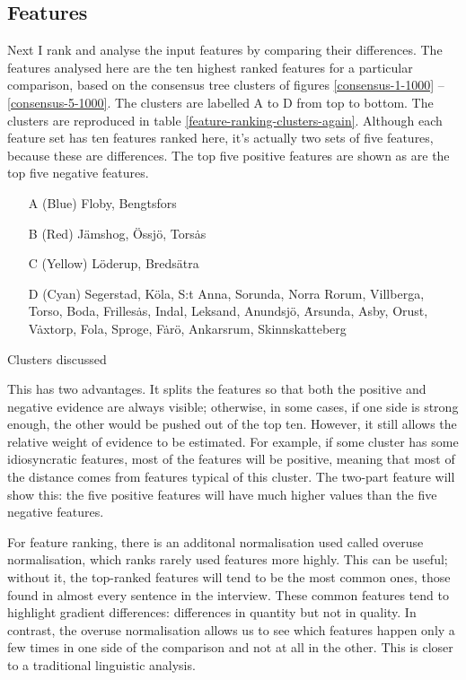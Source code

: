 \subsection{Features}


Next I rank and analyse the input features by comparing their
differences. The features analysed here are the ten highest ranked
features for a particular comparison, based on the consensus tree
clusters of figures \ref{consensus-1-1000} --
\ref{consensus-5-1000}. The clusters are labelled A to D from top to
bottom. The clusters are reproduced in table
\ref{feature-ranking-clusters-again}. Although each feature set has
ten features ranked here, it's actually two sets of five features,
because these are differences. The top five positive features are
shown as are the top five negative features.

\begin{table}
  \begin{enumerate}
   \item[A] (Blue) Floby, Bengtsfors
    \item[B] (Red) J\"amshog, \"Ossj\"o, Tors\.as
    \item[C] (Yellow) L\"oderup, Breds\"atra
    \item[D] (Cyan) Segerstad, K\"ola, S:t Anna, Sorunda, Norra Rorum,
      Villberga, Torso, Boda, Frilles\.as, Indal, Leksand, Anundsj\"o,
      \.Arsunda, Asby, Orust, V\.axtorp, Fola, Sproge, F\.ar\"o,
      Ankarsrum, Skinnskatteberg
  \end{enumerate}
  \caption{Clusters discussed}
  \label{feature-ranking-clusters-again}
\end{table}

This has two advantages. It splits the features so that both the
positive and negative evidence are always visible; otherwise, in some
cases, if one side is strong enough, the other would be pushed out of
the top ten. However, it still allows the relative weight of evidence
to be estimated. For example, if some cluster has some idiosyncratic
features, most of the features will be positive, meaning that most of
the distance comes from features typical of this cluster. The two-part
feature will show this: the five positive features will have much
higher values than the five negative features.

For feature ranking, there is an additonal normalisation used
called overuse normalisation, which ranks rarely used features more
highly.  This can be useful; without it, the top-ranked features will
tend to be the most common ones, those found in almost every sentence
in the interview. These common features tend to highlight
gradient differences: differences in quantity but not in quality. In contrast,
the overuse normalisation allows us to see which features happen only
a few times in one side of the comparison and not at all in the
other. This is closer to a traditional linguistic analysis.

